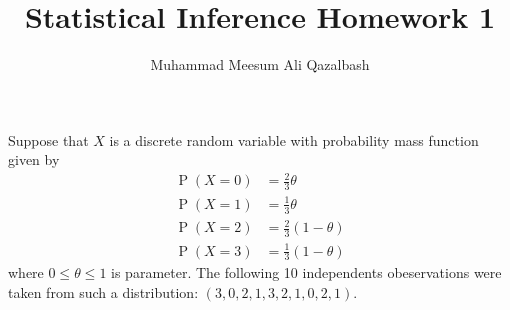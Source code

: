 \documentclass[addpoints]{exam}
\title{Statistical Inference Homework 1}
\author{Muhammad Meesum Ali Qazalbash}
\theoremstyle{mytheoremstyle}
\theoremstyle{mytheoremstyle}
\theoremstyle{myproblemstyle}
\begin{document}
\maketitle

\begin{questions}
    \question Suppose that \(X\) is a discrete random variable with probability mass function given by
    \begin{align*}
        \operatorname{P}(X=0) & =\frac{2}{3}\theta     \\
        \operatorname{P}(X=1) & =\frac{1}{3}\theta     \\
        \operatorname{P}(X=2) & =\frac{2}{3}(1-\theta) \\
        \operatorname{P}(X=3) & =\frac{1}{3}(1-\theta)
    \end{align*}
    where \(0\leq\theta\leq1\) is parameter. The following 10 independents obeservations were taken from such a distribution: \((3, 0, 2, 1, 3, 2, 1, 0, 2, 1)\).

\end{questions}
\end{document}
